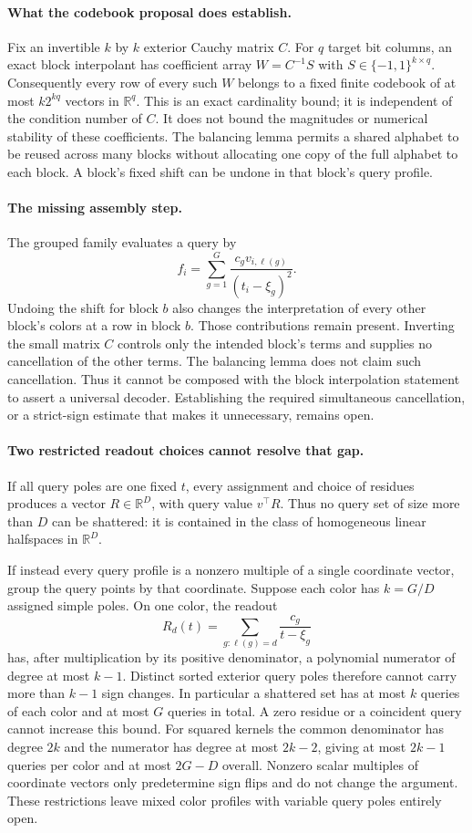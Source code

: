 \documentclass[11pt]{article}
\begin{document}
\paragraph{What the codebook proposal does establish.}
Fix an invertible $k$ by $k$ exterior Cauchy matrix $C$. For $q$ target
bit columns, an exact block interpolant has coefficient array
$W=C^{-1}S$ with $S\in\{-1,1\}^{k\times q}$. Consequently every row
of every such $W$ belongs to a fixed finite codebook of at most
$k2^{kq}$ vectors in $\mathbb R^q$. This is an exact cardinality bound;
it is independent of the condition number of $C$. It does not bound
the magnitudes or numerical stability of these coefficients. The
balancing lemma permits a shared alphabet to be reused across many
blocks without allocating one copy of the full alphabet to each block.
A block's fixed shift can be undone in that block's query profile.

\paragraph{The missing assembly step.}
The grouped family evaluates a query by
\[
 f_i=\sum_{g=1}^G\frac{c_g v_{i,\ell(g)}}{(t_i-\xi_g)^2}.
\]
Undoing the shift for block $b$ also changes the interpretation of every
other block's colors at a row in block $b$. Those contributions remain
present. Inverting the small matrix $C$ controls only the intended
block's terms and supplies no cancellation of the other terms. The
balancing lemma does not claim such cancellation. Thus it cannot be
composed with the block interpolation statement to assert a universal
decoder. Establishing the required simultaneous cancellation, or a
strict-sign estimate that makes it unnecessary, remains open.

\paragraph{Two restricted readout choices cannot resolve that gap.}
If all query poles are one fixed $t$, every assignment and choice of
residues produces a vector $R\in\mathbb R^D$, with query value $v^\top R$.
Thus no query set of size more than $D$ can be shattered: it is contained
in the class of homogeneous linear halfspaces in $\mathbb R^D$.

If instead every query profile is a nonzero multiple of a single
coordinate vector, group the query points by that coordinate. Suppose
each color has $k=G/D$ assigned simple poles. On one color, the readout
\[
 R_d(t)=\sum_{g:\ell(g)=d}\frac{c_g}{t-\xi_g}
\]
has, after multiplication by its positive denominator, a polynomial
numerator of degree at most $k-1$. Distinct sorted exterior query poles
therefore cannot carry more than $k-1$ sign changes. In particular a
shattered set has at most $k$ queries of each color and at most $G$
queries in total. A zero residue or a coincident query cannot increase
this bound. For squared kernels the common denominator has degree $2k$
and the numerator has degree at most $2k-2$, giving at most $2k-1$
queries per color and at most $2G-D$ overall. Nonzero scalar multiples
of coordinate vectors only predetermine sign flips and do not change
the argument. These restrictions leave mixed color profiles with
variable query poles entirely open.
\end{document}
